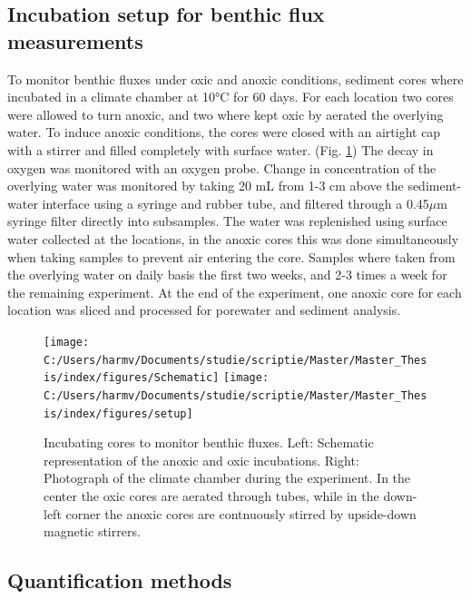 \documentclass[a4paper,11pt]{article}
\begin{document}
\hypertarget{incubation-setup-for-benthic-flux-measurements}{%
\subsection{Incubation setup for benthic flux measurements}\label{incubation-setup-for-benthic-flux-measurements}}

To monitor benthic fluxes under oxic and anoxic conditions, sediment cores where incubated in a climate chamber at 10°C for 60 days. For each location two cores were allowed to turn anoxic, and two where kept oxic by aerated the overlying water. To induce anoxic conditions, the cores were closed with an airtight cap with a stirrer and filled completely with surface water. (Fig. \ref{fig:setup}) The decay in oxygen was monitored with an oxygen probe. Change in concentration of the overlying water was monitored by taking 20 mL from 1-3 cm above the sediment-water interface using a syringe and rubber tube, and filtered through a 0.45\(\mu\)m syringe filter directly into subsamples. The water was replenished using surface water collected at the locations, in the anoxic cores this was done simultaneously when taking samples to prevent air entering the core. Samples where taken from the overlying water on daily basis the first two weeks, and 2-3 times a week for the remaining experiment. At the end of the experiment, one anoxic core for each location was sliced and processed for porewater and sediment analysis.
\begin{figure}

{\centering \texttt{[image: C:/Users/harmv/Documents/studie/scriptie/Master/Master\_Thesis/index/figures/Schematic]} \texttt{[image: C:/Users/harmv/Documents/studie/scriptie/Master/Master\_Thesis/index/figures/setup]} 

}

\caption{Incubating cores to monitor benthic fluxes. Left: Schematic representation of the anoxic and oxic incubations. Right: Photograph of the climate chamber during the experiment. In the center the oxic cores are aerated through tubes, while in the down-left corner the anoxic cores are contnuously stirred by upside-down magnetic stirrers.}\label{fig:setup}
\end{figure}
\hypertarget{quantification-methods}{%
\subsection{Quantification methods}\label{quantification-methods}}
\end{document}
